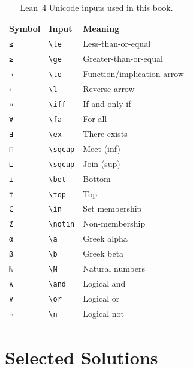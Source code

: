 \documentclass[12pt, a4paper, openright]{book}
\theoremstyle{thmstyle}
\theoremstyle{defstyle}
\newcommand{\lc}[1]{\texttt{#1}}
\begin{document}
\begin{table}[h]
  \centering
  \begin{tabular}{lll}
    \toprule
    Symbol & Input & Meaning \\
    \midrule
    \lc{≤}  & \texttt{\textbackslash{}le}   & Less-than-or-equal \\
    \lc{≥}  & \texttt{\textbackslash{}ge}   & Greater-than-or-equal \\
    \lc{→}  & \texttt{\textbackslash{}to}   & Function/implication arrow \\
    \lc{←}  & \texttt{\textbackslash{}l}    & Reverse arrow \\
    \lc{↔}  & \texttt{\textbackslash{}iff}  & If and only if \\
    \lc{∀}  & \texttt{\textbackslash{}fa}   & For all \\
    \lc{∃}  & \texttt{\textbackslash{}ex}   & There exists \\
    \lc{⊓}  & \texttt{\textbackslash{}sqcap}& Meet (inf) \\
    \lc{⊔}  & \texttt{\textbackslash{}sqcup}& Join (sup) \\
    \lc{⊥}  & \texttt{\textbackslash{}bot}  & Bottom \\
    \lc{⊤}  & \texttt{\textbackslash{}top}  & Top \\
    \lc{∈}  & \texttt{\textbackslash{}in}   & Set membership \\
    \lc{∉}  & \texttt{\textbackslash{}notin}& Non-membership \\
    \lc{α}  & \texttt{\textbackslash{}a}    & Greek alpha \\
    \lc{β}  & \texttt{\textbackslash{}b}    & Greek beta \\
    \lc{ℕ}  & \texttt{\textbackslash{}N}    & Natural numbers \\
    \lc{∧}  & \texttt{\textbackslash{}and}  & Logical and \\
    \lc{∨}  & \texttt{\textbackslash{}or}   & Logical or \\
    \lc{¬}  & \texttt{\textbackslash{}n}    & Logical not \\
    \bottomrule
  \end{tabular}
  \caption{Lean~4 Unicode inputs used in this book.}
\end{table}

\chapter*{Selected Solutions}
\end{document}
